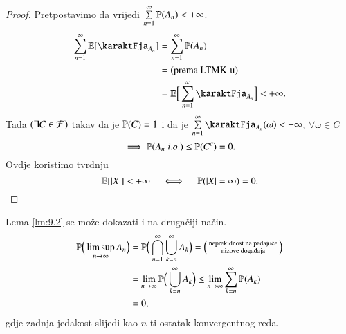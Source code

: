 \begin{proof}
    Pretpostavimo da vrijedi
    $\sum\limits_{n = 1}^{\infty} \mathbb{P}({A_n}) < +\infty$.
    \begin{equation*}
        \begin{aligned}
            \suma{n = 1}{\infty} \masE [ \karaktFja_{A_n} ] &= \suma{n = 1}{\infty} \vjeroj{A_n}\\
            &= (\textnormal{prema LTMK-u})\\
            &= \masE \Big[ \suma{n = 1}{\infty} \karaktFja_{A_n} \Big] < +\infty.
        \end{aligned}
    \end{equation*}
    Tada $(\exists C \in \mathcal{F})$ takav da je $\mathbb{P}({C}) = 1$ i da je $\suma{n = 1}{\infty} \karaktFja_{A_n}(\omega) < +\infty$, $\forall \omega \in C$
    \begin{equation*}
        \implies \mathbb{P}({A_n \; i.o.}) \leq \mathbb{P}({C^c}) = 0. 
    \end{equation*}
    Ovdje koristimo tvrdnju
    \begin{equation*}
        \mathbb{E} [|X|] < +\infty \quad \iff \quad \mathbb{P} (|X| = \infty) = 0.
    \end{equation*}
\end{proof}

\begin{nap} \label{nap:9.2-1}
    Lema \ref{lm:9.2} se mo\v ze dokazati i na druga\v ciji na\v cin.
    \begin{equation*}
        \begin{aligned}
            \masP \Big( \limsup\limits_{n \to \infty} A_n \Big) &= \masP \Big( \presjek{n = 1}{\infty} \unija{k = n}{\infty} A_k \Big) =
            \begin{psmallmatrix}
                \textnormal{neprekidnost na padaju\' ce}\\
                \textnormal{nizove doga\dj aja}
            \end{psmallmatrix}\\
            &= \lim\limits_{n \to \infty} \masP \Big( \unija{k = n}{\infty} A_k \Big) \leq \lim\limits_{n \to \infty} \suma{k = n}{\infty} \masP (A_k)\\
            &= 0,
        \end{aligned}
    \end{equation*}
    gdje zadnja jedakost slijedi kao $n$-ti ostatak konvergentnog reda.
\end{nap}

